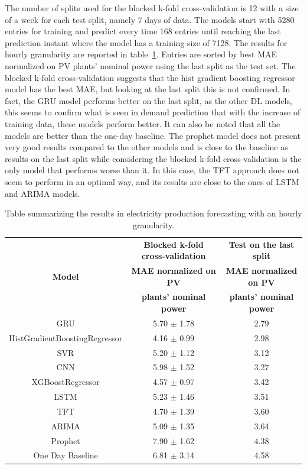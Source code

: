 The number of splits used for the blocked k-fold cross-validation is 12 with a size of a week for each test split, namely 7 days of data.
The models start with 5280 entries for training and predict every time 168 entries until reaching the last prediction instant where the model has a training size of 7128.
The results for hourly granularity are reported in table~\ref{tab:productionhourlyresults}.
Entries are sorted by best MAE normalized on PV plants' nominal power using the last split as the test set.
The blocked k-fold cross-validation suggests that the hist gradient boosting regressor model has the best MAE, but looking at the last split this is not confirmed.
In fact, the GRU model performs better on the last split, as the other DL models, this seems to confirm what is seen in demand prediction that with the increase of training data, these models perform better.
It can also be noted that all the models are better than the one-day baseline.
The prophet model does not present very good results compared to the other models and is close to the baseline as results on the last split while considering the blocked k-fold cross-validation is the only model that performs worse than it.
In this case, the TFT approach does not seem to perform in an optimal way, and its results are close to the ones of LSTM and ARIMA models.

\begin{table}[H]
\centering
\begin{tabular}{|c|c|c|}
\hline
 & \textbf{Blocked k-fold cross-validation} & \textbf{Test on the last split}\\
\textbf{Model} & \textbf{MAE normalized on PV} & \textbf{MAE normalized on PV}\\
 & \textbf{plants' nominal power} & \textbf{plants' nominal power}\\
\hline
GRU & 5.70 $\pm$ 1.78 & 2.79\\
\hline
HistGradientBoostingRegressor & 4.16 $\pm$ 0.99 & 2.98\\
\hline
SVR & 5.20 $\pm$ 1.12 & 3.12\\
\hline
CNN & 5.98 $\pm$ 1.52 & 3.27\\
\hline
XGBoostRegressor & 4.57 $\pm$ 0.97 & 3.42\\
\hline
LSTM & 5.23 $\pm$ 1.46 & 3.51\\
\hline
TFT & 4.70 $\pm$ 1.39 & 3.60\\
\hline
ARIMA & 5.09 $\pm$ 1.35 & 3.64\\
\hline
Prophet & 7.90 $\pm$ 1.62 & 4.38\\
\hline
One Day Baseline & 6.81 $\pm$ 3.14 & 4.58\\
\hline
\end{tabular}
\caption{Table summarizing the results in electricity production forecasting with an hourly granularity.}
\label{tab:productionhourlyresults}
\end{table}

